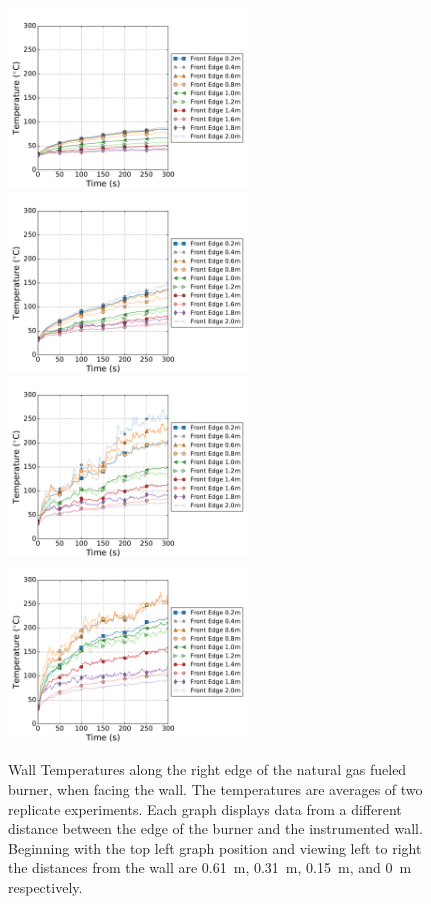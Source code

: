 \documentclass[twoside]{uocthesis}
\begin{document}
{\begin{figure}[ht!]
	\centering
	\includegraphics[width=2.5in]{../Figures/TWNG01_TC_Surface_Offset_Avg}
	\includegraphics[width=2.5in]{../Figures/TWNG03_TC_Surface_Offset_Avg}\\
	\includegraphics[width=2.5in]{../Figures/TWNG05_TC_Surface_Offset_Avg}
	\includegraphics[width=2.5in]{../Figures/TWNG07_TC_Surface_Offset_Avg}\\
	\caption[Wall Temperatures along the edge of the natural gas fueled burner]{Wall Temperatures along the right edge of the natural gas fueled burner, when facing the wall. The temperatures are averages of two replicate experiments. Each graph displays data from a different distance between the edge of the burner and the instrumented wall.  Beginning with the top left graph position and viewing left to right the distances from the wall are 0.61~m, 0.31~m, 0.15~m, and 0~m respectively.}
	\label{TC_Surf_Edge_TWNG_comp}
\end{figure}

}
\end{document}
